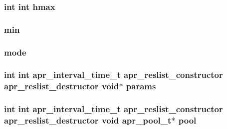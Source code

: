 \subsubsection[{\texorpdfstring{hmax}{hmax}}]{ {\bf int} {\bf int} hmax}\hypertarget{group__APR__Util__RL_gae289b3d27f213c0c0525b41741ab8201}{}\label{group__APR__Util__RL_gae289b3d27f213c0c0525b41741ab8201}
\subsubsection[{\texorpdfstring{min}{min}}]{ min}\hypertarget{group__APR__Util__RL_ga3e202b201e6255d975cd6d3aff1f5a4d}{}\label{group__APR__Util__RL_ga3e202b201e6255d975cd6d3aff1f5a4d}
\subsubsection[{\texorpdfstring{mode}{mode}}]{ mode}\hypertarget{group__APR__Util__RL_ga22a1aa1b710da89106f72460a06a6b5d}{}\label{group__APR__Util__RL_ga22a1aa1b710da89106f72460a06a6b5d}
\subsubsection[{\texorpdfstring{params}{params}}]{ {\bf int} {\bf int} {\bf apr\+\_\+interval\+\_\+time\+\_\+t} {\bf apr\+\_\+reslist\+\_\+constructor} {\bf apr\+\_\+reslist\+\_\+destructor} {\bf void}$\ast$ params}\hypertarget{group__APR__Util__RL_ga1d35e736cdbc73587323e02e92a68713}{}\label{group__APR__Util__RL_ga1d35e736cdbc73587323e02e92a68713}
\subsubsection[{\texorpdfstring{pool}{pool}}]{ {\bf int} {\bf int} {\bf apr\+\_\+interval\+\_\+time\+\_\+t} {\bf apr\+\_\+reslist\+\_\+constructor} {\bf apr\+\_\+reslist\+\_\+destructor} {\bf void} {\bf apr\+\_\+pool\+\_\+t}$\ast$ pool}\hypertarget{group__APR__Util__RL_gacf6798552feb00325fcde6cf23b1ebee}{}\label{group__APR__Util__RL_gacf6798552feb00325fcde6cf23b1ebee}
